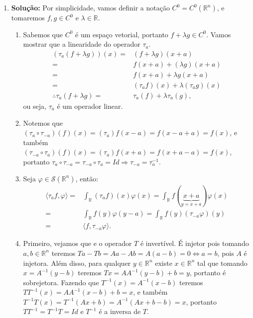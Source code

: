 \documentclass{article}
\begin{document}
\begin{enumerate}
		
		\item \textbf{Solução:} Por simplicidade, vamos definir a notação $C^{0} = C^{0}(\mathbb{R}^{n})$, e tomaremos $f, g \in C^{0}$ e $\lambda \in \mathbb{R}$.
			\begin{enumerate}
				\item Sabemos que $C^{0}$ é um espaço vetorial, portanto $f + \lambda g \in C^{0}$. Vamos mostrar que a linearidade do operador $\tau_{a}$.
				$$
				\begin{aligned}
				(\tau_{a}(f+\lambda g))(x) = &  (f+\lambda g)(x+a) \\
				= & f(x+a) +(\lambda g)(x+a)
				\\
				= & f(x+a) +\lambda g(x+a)
				\\
				= & (\tau_{a}f)(x) +\lambda (\tau_{a}g)(x)
				\\
				\therefore \tau_{a}(f+\lambda g) = & \tau_{a}(f)+\lambda \tau_{a}(g),
				\end{aligned}
				$$
				ou seja, $\tau_{a}$ é um operador linear.
				
				\item Notemos que $(\tau_{a} \circ \tau_{-a})(f)(x) = (\tau_{a})f(x-a) = f(x- a+a) = f(x)$, e também $(\tau_{-a} \circ \tau_{a})(f)(x) = (\tau_{a})f(x+a) = f(x+a-a) = f(x)$, portanto $\tau_{a} \circ \tau_{-a} = \tau_{-a} \circ \tau_{a} = Id \Rightarrow \tau_{-a} = \tau^{-1}_{a}$.
				
				\item Seja $\varphi \in \mathcal{S}(\mathbb{R}^{n})$, então:
				$$
				\begin{aligned}
				\langle \tau_{a}f, \varphi \rangle = & \int_{\mathbb{R}} (\tau_{a}f)(x)\varphi(x)
				= \int_{\mathbb{R}} f(\underbrace{ x+a }_{y = x+a}) \varphi(x)
				\\
				= & \int_{\mathbb{R}} f(y)\varphi(y-a)
				=  \int_{\mathbb{R}} f(y) (\tau_{-a}\varphi)(y) 
				\\
				= & \langle f, \tau_{-a}\varphi \rangle.
				\end{aligned}
				$$
				
				\item Primeiro, vejamos que e o operador $T$ é invertível. É injetor pois tomando $a, b \in \mathbb{R}^{n}$ teremos $Ta- Tb = Aa - Ab = A(a-b) = 0 \iff a=b$, pois $A$ é injetora. Além disso, para qualquer $y \in \mathbb{R}^{n}$ existe $x \in \mathbb{R}^{n}$ tal que tomando $x = A^{-1}(y -b)$ teremos $Tx = AA^{-1}(y -b) + b = y$, portanto é sobrejetora. Fazendo que $T^{-1}(x) = A^{-1}(x - b)$ teremos $TT^{-1}(x) = AA^{-1}(x - b) + b = x$, e também $T^{-1}T(x) = T^{-1}(Ax + b) = A^{-1}(Ax+b - b) = x$, portanto $TT^{-1} = T^{-1}T = Id$ e $T^{-1}$ é a inversa de $T$.
				

\end{enumerate}
\end{enumerate}
\end{document}
